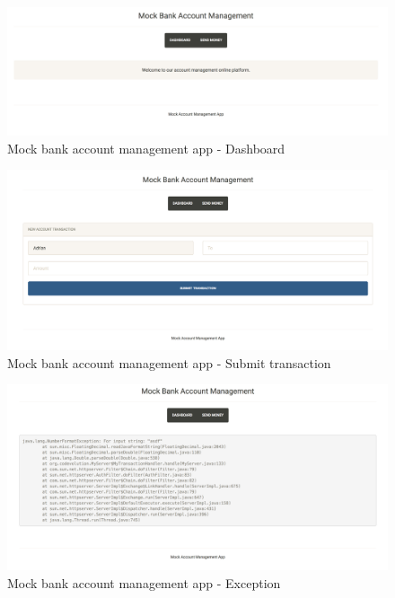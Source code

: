 \begin{figure}[H]
  \centering
    \includegraphics[width=\textwidth]{java-test.png}
  \caption[Mock bank account management app - Dashboard]{Mock bank account management app - Dashboard}
\end{figure}

\begin{figure}[H]
  \centering
    \includegraphics[width=\textwidth]{java-test2.png}
  \caption[Mock bank account management app - Submit transaction]{Mock bank account management app - Submit transaction}
\end{figure}

\begin{figure}[H]
  \centering
    \includegraphics[width=\textwidth]{java-test3.png}
  \caption[Mock bank account management app - Exception]{Mock bank account management app - Exception}
\end{figure}

